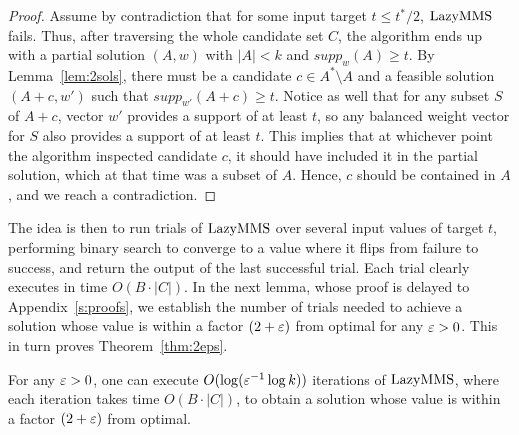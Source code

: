 \begin{proof}
Assume by contradiction that for some input target $t\leq t^*/2$, $\operatorname{LazyMMS}$ fails. Thus, after traversing the whole candidate set $C$, the algorithm ends up with a partial solution $(A,w)$ with $|A|<k$ and $supp_w(A)\geq t$. By Lemma~\ref{lem:2sols}, there must be a candidate $c\in A^*\setminus A$ and a feasible solution $(A+c, w')$ such that $supp_{w'}(A+c)\geq t$. Notice as well that for any subset $S$ of $A+c$, vector $w'$ provides a support of at least $t$, so any balanced weight vector for $S$ also provides a support of at least $t$. This implies that at whichever point the algorithm inspected candidate $c$, it should have included it in the partial solution, which at that time was a subset of $A$. Hence, $c$ should be contained in $A$, and we reach a contradiction.
\end{proof}

The idea is then to run trials of $\operatorname{LazyMMS}$ over several input values of target $t$, performing binary search to converge to a value where it flips from failure to success, and return the output of the last successful trial. Each trial clearly executes in time $O(B\cdot |C|)$. 
In the next lemma, whose proof is delayed to Appendix~\ref{s:proofs}, we establish the number of trials needed to achieve a solution whose value is within a factor $(2+\varepsilon)$ from optimal for any $\varepsilon>0$. This in turn proves Theorem~\ref{thm:2eps}.

\begin{lemma}\label{lem:lazybinary}
For any $\varepsilon>0$, one can execute $O(\log(\varepsilon^{-1}\log k))$ iterations of $\operatorname{LazyMMS}$, where each iteration takes time $O(B\cdot |C|)$, to obtain a solution whose value is within a factor $(2+\varepsilon)$ from optimal.
\end{lemma}
